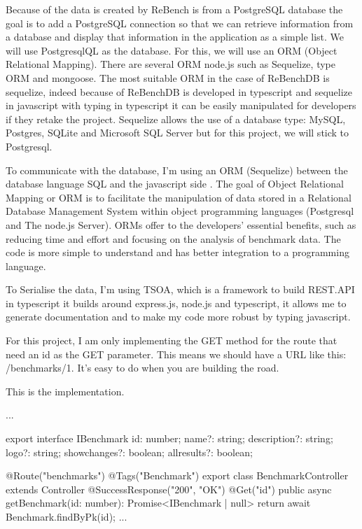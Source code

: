 \documentclass[12pt,a4paper]{article}
\begin{document}
Because of the data is created by ReBench is from a PostgreSQL database the goal is to add a PostgreSQL connection so that we can retrieve information from a database and display that information in the application as a simple list.
We will use PostgresqlQL as the database. For this, we will use an ORM (Object Relational Mapping). There are several ORM node.js such as Sequelize, type ORM and mongoose. The most suitable ORM in the case of ReBenchDB is sequelize, indeed because of ReBenchDB is developed in typescript and sequelize in javascript with typing in typescript it can be easily manipulated for developers if they retake the project. Sequelize allows the use of a database type: MySQL, Postgres, SQLite and Microsoft SQL Server but for this project, we will stick to Postgresql.

To communicate with the database, I'm using an ORM (Sequelize) between the database language SQL and the javascript side \citep{pereira2016working}. The goal of Object Relational Mapping or ORM is to facilitate the manipulation of data stored in a Relational Database Management System within object programming languages (Postgresql and The node.js Server). ORMs offer to the developers' essential benefits, such as reducing time and effort and focusing on the analysis of benchmark data. The code is more simple to understand and has better integration to a programming language.


To Serialise the data, I'm using TSOA, which is a framework to build REST.API in typescript it builds around express.js, node.js and typescript, it allows me to generate documentation and to make my code more robust by typing javascript.

For this project, I am only implementing the GET method for the route that need an id as the GET parameter. This means we should have a URL like this: /benchmarks/1. It's easy to do when you are building the road.

This is the implementation.

\begin{python}
...

export interface IBenchmark {
  id: number;
  name?: string;
  description?: string;
  logo?: string;
  showchanges?: boolean;
  allresults?: boolean;
}

@Route("benchmarks")
@Tags("Benchmark")
export class BenchmarkController extends Controller {
  @SuccessResponse("200", "OK")
  @Get("{id}")
  public async getBenchmark(id: number): Promise<IBenchmark | null> {
    return await Benchmark.findByPk(id);
  }
  ...
}
\end{python}
\end{document}
